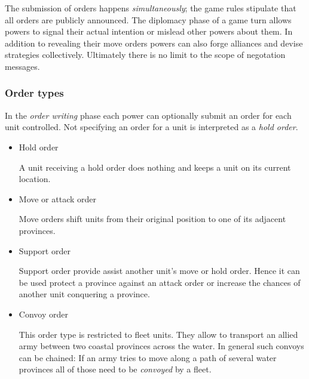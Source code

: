 \documentclass[pdftex,12pt,a4paper]{report}
\begin{document}
The submission of orders happens \textit{simultaneously}; the game
rules stipulate that all orders are publicly announced. The diplomacy
phase of a game turn allows powers to signal their actual intention or
mislead other powers about them. In addition to revealing their move
orders powers can also forge alliances and devise strategies
collectively. Ultimately there is no limit to the scope of negotation
messages.

\subsubsection{Order types}

In the \textit{order writing} phase each power can optionally submit
an order for each unit controlled. Not specifying an order for a 
unit is interpreted as a \textit{hold order}. 

\begin{itemize}

\item Hold order

A unit receiving a hold order does nothing and keeps a unit on its 
current location. 

\item Move or attack order 

Move orders shift units from their original position to one of its
adjacent provinces.

\item Support order

Support order provide assist another unit's move or hold order. Hence
it can be used protect a province against an attack order or increase
the chances of another unit conquering a province. 

\item Convoy order

This order type is restricted to fleet units. They allow to transport
an allied army between two coastal provinces across the water. In general
such convoys can be chained: If an army tries to move along a path of
several water provinces all of those need to be \textit{convoyed} 
by a fleet.

\end{itemize}



\pagebreak
\end{document}
